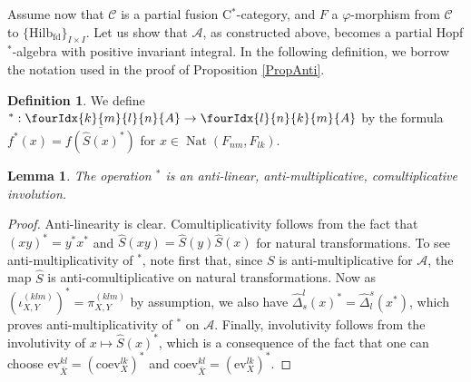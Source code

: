 \documentclass[10pt]{article}
\DeclareMathOperator{\fin}{\mathrm{fd}}
\DeclareMathOperator{\Nat}{\mathrm{Nat}}
\newcommand{\CatCC}{\mathscr{C}}
\newcommand{\Hilb}{\mathrm{Hilb}}
\newcommand{\ev}{\mathrm{ev}}
\newcommand{\coev}{\mathrm{coev}}
\newcommand{\Gr}[5]{\fourIdx{#2}{#4}{#3}{#5}{#1}}%
\newtheorem{Lem}[Theorem]{Lemma}
\theoremstyle{definition}
\newtheorem{Def}[Theorem]{Definition}
\numberwithin{equation}{section}
\begin{document}
Assume now that $\CatCC$ is a partial fusion C$^*$-category, and $F$ a $\varphi$-morphism from $\CatCC$ to $\{\Hilb_{\fin}\}_{I\times I}$. Let us show that $\mathscr{A}$, as constructed above, becomes a partial Hopf $^*$-algebra with positive invariant integral. In the following definition, we borrow the notation used in the proof of Proposition \ref{PropAnti}.

\begin{Def} We define $^*: \Gr{A}{k}{l}{m}{n}\rightarrow \Gr{A}{l}{k}{n}{m}$ by the formula $f^*(x) = \overline{f(\hat{S}(x)^*)}$ for $x\in \Nat(F_{nm},F_{lk}).$
\end{Def}

\begin{Lem} The operation $^*$ is an anti-linear, anti-multiplicative, comultiplicative involution.
\end{Lem}

\begin{proof} Anti-linearity is clear. Comultiplicativity follows from
  the fact that $(xy)^* = y^*x^*$ and $\hat{S}(xy) =
  \hat{S}(y)\hat{S}(x)$ for natural transformations. To see
  anti-multiplicativity of $^*$, note first that, since $S$ is
  anti-multiplicative for $\mathscr{A}$, the map $\hat{S}$ is anti-comultiplicative on natural transformations. Now as $(\iota_{X,Y}^{(klm)})^* = \pi_{X,Y}^{(klm)}$ by assumption, we also have $\hat{\Delta}^l_s(x)^* = \hat{\Delta}^s_l(x^*)$, which proves anti-multiplicativity of $^*$ on $\mathscr{A}$.  Finally, involutivity follows from the involutivity of $x\mapsto \hat{S}(x)^*$, which is a consequence of the fact that one can choose $\ev_{\bar{X}}^{kl} = (\coev_{X}^{lk})^*$ and $\coev_{\bar{X}}^{kl} = (\ev_X^{lk})^*$.
\end{proof}
\end{document}

